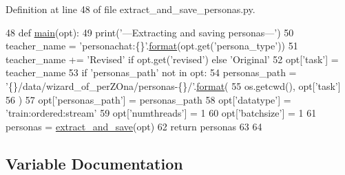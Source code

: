 Definition at line 48 of file extract\+\_\+and\+\_\+save\+\_\+personas.\+py.


\begin{DoxyCode}
48 \textcolor{keyword}{def }\hyperlink{namespacepersonachat__eval_1_1extract__and__save__personas_aa39f496bc78dfa28c1fbc2c4129a915c}{main}(opt):
49     print(\textcolor{stringliteral}{'---Extracting and saving personas---'})
50     teacher\_name = \textcolor{stringliteral}{'personachat:\{\}'}.\hyperlink{namespaceparlai_1_1chat__service_1_1services_1_1messenger_1_1shared__utils_a32e2e2022b824fbaf80c747160b52a76}{format}(opt.get(\textcolor{stringliteral}{'persona\_type'}))
51     teacher\_name += \textcolor{stringliteral}{'Revised'} \textcolor{keywordflow}{if} opt.get(\textcolor{stringliteral}{'revised'}) \textcolor{keywordflow}{else} \textcolor{stringliteral}{'Original'}
52     opt[\textcolor{stringliteral}{'task'}] = teacher\_name
53     \textcolor{keywordflow}{if} \textcolor{stringliteral}{'personas\_path'} \textcolor{keywordflow}{not} \textcolor{keywordflow}{in} opt:
54         personas\_path = \textcolor{stringliteral}{'\{\}/data/wizard\_of\_perZOna/personas-\{\}/'}.\hyperlink{namespaceparlai_1_1chat__service_1_1services_1_1messenger_1_1shared__utils_a32e2e2022b824fbaf80c747160b52a76}{format}(
55             os.getcwd(), opt[\textcolor{stringliteral}{'task'}]
56         )
57         opt[\textcolor{stringliteral}{'personas\_path'}] = personas\_path
58     opt[\textcolor{stringliteral}{'datatype'}] = \textcolor{stringliteral}{'train:ordered:stream'}
59     opt[\textcolor{stringliteral}{'numthreads'}] = 1
60     opt[\textcolor{stringliteral}{'batchsize'}] = 1
61     personas = \hyperlink{namespacepersonachat__eval_1_1extract__and__save__personas_a7bae99c34a0b3f49cbce1328146926fd}{extract\_and\_save}(opt)
62     \textcolor{keywordflow}{return} personas
63 
64 
\end{DoxyCode}


\subsection{Variable Documentation}
\mbox{\label{namespaceparlai_1_1mturk_1_1tasks_1_1wizard__of__wikipedia_1_1extract__and__save__personas_a437642672add9070476f2acec19c1622}} 
